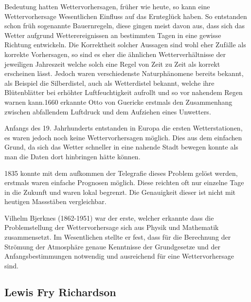 \begin{refsection}
Bedeutung hatten Wettervorhersagen, früher wie heute, so kann eine Wettervorhersage Wesentlichen Einfluss auf das Ernteglück haben. So entstanden schon früh sogenannte Bauernregeln, diese gingen meist davon aus, dass sich das Wetter aufgrund Wetterereignissen an bestimmten Tagen in eine gewisse Richtung entwickeln. Die Korrektheit solcher Aussagen sind wohl eher Zufälle als korrekte Vorhersagen, so sind es eher die ähnlichen Wetterverhältnisse der jeweiligen Jahreszeit welche solch eine Regel von Zeit zu Zeit als korrekt erscheinen lässt. Jedoch waren verschiedenste Naturphänomene bereits bekannt, als Beispiel die Silberdistel, auch als Wetterdistel bekannt, welche ihre Blütenblätter bei erhöhter Luftfeuchtigkeit aufrollt und so vor nahendem Regen warnen kann.1660 erkannte Otto von Guericke erstmals den Zusammenhang zwischen abfallendem Luftdruck und dem Aufziehen eines Unwetters.

Anfangs des 19. Jahrhunderts entstanden in Europa die ersten Wetterstationen, es waren jedoch noch keine Wettervorhersagen möglich. Dies aus dem einfachen Grund, da sich das Wetter schneller in eine nahende Stadt bewegen konnte als man die Daten dort hinbringen hätte können.

1835 konnte mit dem aufkommen der Telegrafie dieses Problem gelöst werden, erstmals waren einfache Prognosen möglich. Diese reichten oft nur einzelne Tage in die Zukunft und waren lokal begrenzt. Die Genauigkeit dieser ist nicht mit heutigen Massstäben vergleichbar.

Vilhelm Bjerknes (1862-1951) war der erste, welcher erkannte dass die Problemstellung der Wettervorhersage sich aus Physik und Mathematik zusammensetzt. Im Wesentlichen stellte er fest, dass für die Berechnung der Strömung der Atmosphäre genaue Kenntnisse der Grundgesetze und der Anfangsbestimmungen notwendig und ausreichend für eine Wettervorhersage sind.



\subsection{Lewis Fry Richardson
\label{klima:subsection:richardson}}


\end{refsection}

